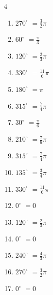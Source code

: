 \begin{multicols}{4}
\begin{enumerate}
  \item $\displaystyle 270^{\circ}$
        $\displaystyle =\frac{3}{2}\pi$

\columnbreak %

  \item $\displaystyle 60^{\circ}$
        $\displaystyle =\frac{\pi}{3}$

  \item $\displaystyle 120^{\circ}$
        $\displaystyle =\frac{2}{3}\pi$

  \item $\displaystyle 330^{\circ}$
        $\displaystyle =\frac{11}{6}\pi$

  \item $\displaystyle 180^{\circ}$
        $\displaystyle =\pi$

  \item $\displaystyle 315^{\circ}$
        $\displaystyle =\frac{7}{4}\pi$

  \item $\displaystyle 30^{\circ}$
        $\displaystyle =\frac{\pi}{6}$

  \item $\displaystyle 210^{\circ}$
        $\displaystyle =\frac{7}{6}\pi$

  \item $\displaystyle 315^{\circ}$
        $\displaystyle =\frac{7}{4}\pi$

  \item $\displaystyle 135^{\circ}$
        $\displaystyle =\frac{3}{4}\pi$

  \item $\displaystyle 330^{\circ}$
        $\displaystyle =\frac{11}{6}\pi$

  \item $\displaystyle 0^{\circ}$
        $\displaystyle =0$

  \item $\displaystyle 120^{\circ}$
        $\displaystyle =\frac{2}{3}\pi$

  \item $\displaystyle 0^{\circ}$
        $\displaystyle =0$

  \item $\displaystyle 240^{\circ}$
        $\displaystyle =\frac{4}{3}\pi$

  \item $\displaystyle 270^{\circ}$
        $\displaystyle =\frac{3}{2}\pi$

  \item $\displaystyle 0^{\circ}$
        $\displaystyle =0$


\end{enumerate}
\end{multicols}
